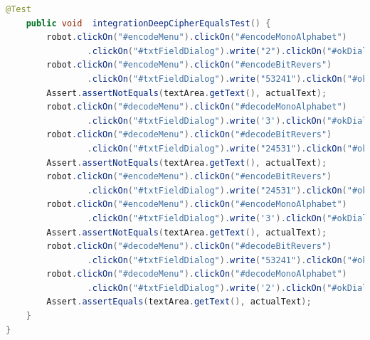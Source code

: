\documentclass[a4paper,12pt]{article}
\begin{document}
\begin{lstlisting}[language=java, caption=код модуля MainWindowUiIntegrationTest.java]
    @Test
    public void  integrationDeepCipherEqualsTest() {
        robot.clickOn("#encodeMenu").clickOn("#encodeMonoAlphabet")
                .clickOn("#txtFieldDialog").write("2").clickOn("#okDialog");
        robot.clickOn("#encodeMenu").clickOn("#encodeBitRevers")
                .clickOn("#txtFieldDialog").write("53241").clickOn("#okDialog");
        Assert.assertNotEquals(textArea.getText(), actualText);
        robot.clickOn("#decodeMenu").clickOn("#decodeMonoAlphabet")
                .clickOn("#txtFieldDialog").write('3').clickOn("#okDialog");
        robot.clickOn("#decodeMenu").clickOn("#decodeBitRevers")
                .clickOn("#txtFieldDialog").write("24531").clickOn("#okDialog");
        Assert.assertNotEquals(textArea.getText(), actualText);
        robot.clickOn("#encodeMenu").clickOn("#encodeBitRevers")
                .clickOn("#txtFieldDialog").write("24531").clickOn("#okDialog");
        robot.clickOn("#encodeMenu").clickOn("#encodeMonoAlphabet")
                .clickOn("#txtFieldDialog").write('3').clickOn("#okDialog");
        Assert.assertNotEquals(textArea.getText(), actualText);
        robot.clickOn("#decodeMenu").clickOn("#decodeBitRevers")
                .clickOn("#txtFieldDialog").write("53241").clickOn("#okDialog");
        robot.clickOn("#decodeMenu").clickOn("#decodeMonoAlphabet")
                .clickOn("#txtFieldDialog").write('2').clickOn("#okDialog");
        Assert.assertEquals(textArea.getText(), actualText);
    }
}
\end{lstlisting}
\end{document}
